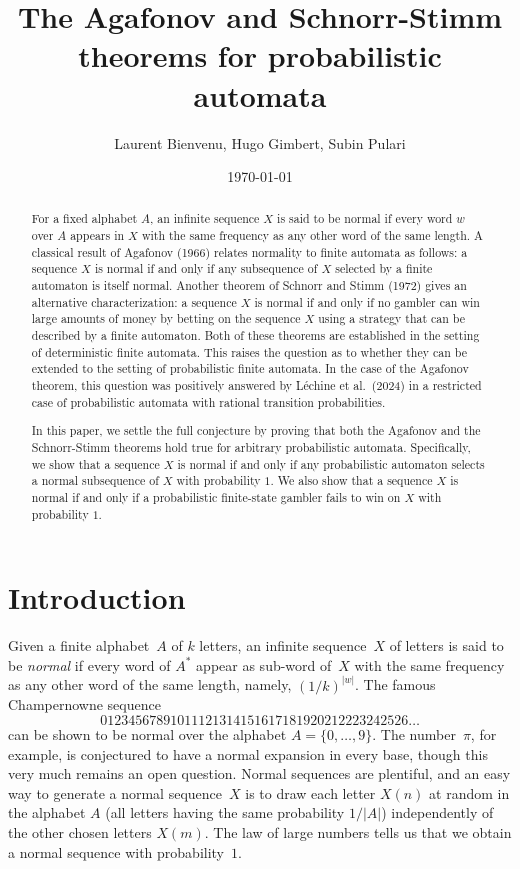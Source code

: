\documentclass[11pt]{article}
\title{The Agafonov and Schnorr-Stimm theorems for probabilistic automata}
\author{Laurent Bienvenu, Hugo Gimbert, Subin Pulari}
\date {\today}
\begin{document}
\maketitle
\begin{abstract}
	
	For a fixed alphabet $A$, an infinite sequence $X$ is said to be normal if every word $w$ over $A$ appears in $X$ with the same frequency as any other word of the same length. A classical result of Agafonov (1966) relates normality to finite automata as follows: a sequence $X$ is normal if and only if any subsequence of $X$ selected by a finite automaton is itself normal. Another theorem of Schnorr and Stimm (1972) gives an alternative characterization: a sequence $X$ is normal if and only if no gambler can win large amounts of money by betting on the sequence $X$ using a strategy that can be described by a finite automaton. Both of these theorems are established in the setting of deterministic finite automata. This raises the question as to whether they can be extended to the setting of probabilistic finite automata. In the case of the Agafonov theorem, this question was positively answered by L\'echine et al.\ (2024) in a restricted case of probabilistic automata with rational transition probabilities. 

In this paper, we settle the full conjecture by proving that both the Agafonov and the Schnorr-Stimm theorems hold true for arbitrary probabilistic automata. Specifically, we show that a sequence $X$ is normal if and only if any probabilistic automaton selects a normal subsequence of $X$ with probability $1$. We also show that a sequence $X$ is normal if and only if a probabilistic finite-state gambler fails to win on $X$ with probability $1$. 

\end{abstract}

\section{Introduction}

Given a finite alphabet~$A$ of $k$ letters, an infinite sequence~$X$ of letters is said to be \emph{normal} if every word of $A^*$ appear as sub-word of~$X$ with the same frequency as any other word of the same length, namely, $(1/k)^{|w|}$. The famous Champernowne sequence 
\[
01234567891011121314151617181920212223242526\ldots
\]
can be shown to be normal over the alphabet $A=\{0, \ldots, 9\}$. The number~$\pi$, for example, is conjectured to have a normal expansion in every base, though this very much remains an open question. Normal sequences are plentiful, and an easy way to generate a normal sequence~$X$ is to draw each letter $X(n)$ at random in the alphabet $A$ (all letters having the same probability $1 / |A|$) independently of the other chosen letters $X(m)$. The law of large numbers tells us that we obtain a normal sequence with probability~$1$. \\
\end{document}

